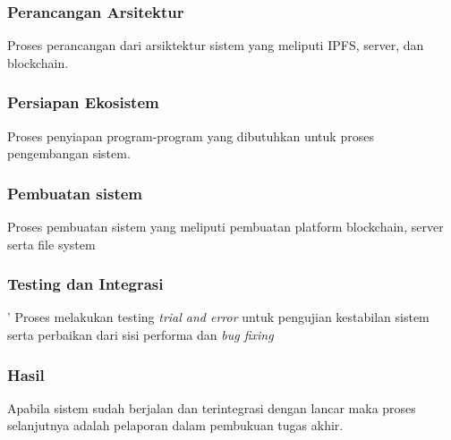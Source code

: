 \subsubsection{Perancangan Arsitektur}
Proses perancangan dari arsiktektur sistem yang meliputi IPFS, server, dan blockchain.

\subsubsection{Persiapan Ekosistem}
Proses penyiapan program-program yang dibutuhkan untuk proses pengembangan sistem.

\subsubsection{Pembuatan sistem}
Proses pembuatan sistem yang meliputi pembuatan platform blockchain, server serta file system

\subsubsection{Testing dan Integrasi}'
Proses melakukan testing \emph{trial and error} untuk pengujian kestabilan sistem serta perbaikan dari sisi performa dan \emph{bug fixing}

\subsubsection{Hasil}
Apabila sistem sudah berjalan dan terintegrasi dengan lancar maka proses selanjutnya adalah pelaporan dalam pembukuan tugas akhir.

